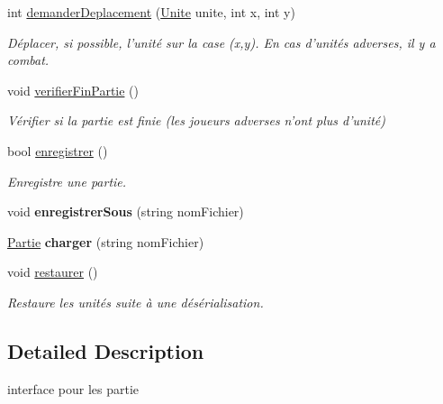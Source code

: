 \begin{DoxyCompactItemize}
int \hyperlink{interface_small_world_1_1_inter_partie_a532da197c321c61ba9c075e00d02bde9}{demander\-Deplacement} (\hyperlink{class_small_world_1_1_unite}{Unite} unite, int x, int y)
\begin{DoxyCompactList}\small\item\em Déplacer, si possible, l'unité sur la case (x,y). En cas d'unités adverses, il y a combat. \end{DoxyCompactList}\item 
void \hyperlink{interface_small_world_1_1_inter_partie_abefef771c059be341130c37dc98876b5}{verifier\-Fin\-Partie} ()
\begin{DoxyCompactList}\small\item\em Vérifier si la partie est finie (les joueurs adverses n'ont plus d'unité) \end{DoxyCompactList}\item 
bool \hyperlink{interface_small_world_1_1_inter_partie_ac1b18e80224dba7e8cb96ae386ed46e3}{enregistrer} ()
\begin{DoxyCompactList}\small\item\em Enregistre une partie. \end{DoxyCompactList}\item 
\hypertarget{interface_small_world_1_1_inter_partie_a04902e267272973c6eec147a87cb2a19}{void {\bfseries enregistrer\-Sous} (string nom\-Fichier)}\label{interface_small_world_1_1_inter_partie_a04902e267272973c6eec147a87cb2a19}

\item 
\hypertarget{interface_small_world_1_1_inter_partie_abb90ffa0496dd58c5333afc32973d28e}{\hyperlink{class_small_world_1_1_partie}{Partie} {\bfseries charger} (string nom\-Fichier)}\label{interface_small_world_1_1_inter_partie_abb90ffa0496dd58c5333afc32973d28e}

\item 
\hypertarget{interface_small_world_1_1_inter_partie_ad80fd5b6fe66be8ac409325e9a15ff33}{void \hyperlink{interface_small_world_1_1_inter_partie_ad80fd5b6fe66be8ac409325e9a15ff33}{restaurer} ()}\label{interface_small_world_1_1_inter_partie_ad80fd5b6fe66be8ac409325e9a15ff33}

\begin{DoxyCompactList}\small\item\em Restaure les unités suite à une désérialisation. \end{DoxyCompactList}\end{DoxyCompactItemize}


\subsection{Detailed Description}
interface pour les partie 

